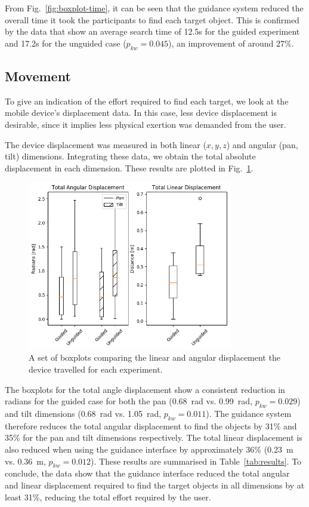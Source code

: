 \documentclass[runningheads]{llncs}
\begin{document}
From Fig.~\ref{fig:boxplot-time}, it can be seen that the guidance system reduced the overall time it took the participants to find each target object.
This is confirmed by the data that show an average search time of 12.5s for the guided experiment and 17.2s for the unguided case ($p_{kw}=0.045$), an improvement of around 27\%.

\subsection{Movement}

To give an indication of the effort required to find each target, we look at the mobile device's displacement data. 
In this case, less device displacement is desirable, since it implies less physical exertion was demanded from the user.

The device displacement was measured in both linear ($x, y, z$) and angular (pan, tilt) dimensions.
Integrating these data, we obtain the total absolute displacement in each dimension.
These results are plotted in Fig.~\ref{fig:boxplot-displacement}.

\begin{figure}
  \centering
  \includegraphics[width=0.8\textwidth]{figures/boxplot_displacement.png}
  \caption{A set of boxplots comparing the linear and angular displacement the device travelled for each experiment. }\label{fig:boxplot-displacement}
\end{figure}

The boxplots for the total angle displacement show a consistent reduction in radians for the guided case for both the pan (\SI{0.68}{\radian} vs. \SI{0.99}{\radian}, $p_{kw}=0.029$) and tilt dimensions (\SI{0.68}{\radian} vs. \SI{1.05}{\radian}, $p_{kw}=0.011$). 
The guidance system therefore reduces the total angular displacement to find the objects by 31\% and 35\% for the pan and tilt dimensions respectively. 
The total linear displacement is also reduced when using the guidance interface by approximately 36\% (\SI{0.23}{\metre} vs. \SI{0.36}{\metre}, $p_{kw}=0.012$).
These results are summarised in Table~\ref{tab:results}.
To conclude, the data show that the guidance interface reduced the total angular and linear displacement required to find the target objects in all dimensions by at least 31\%, reducing the total effort required by the user. 
\end{document}

